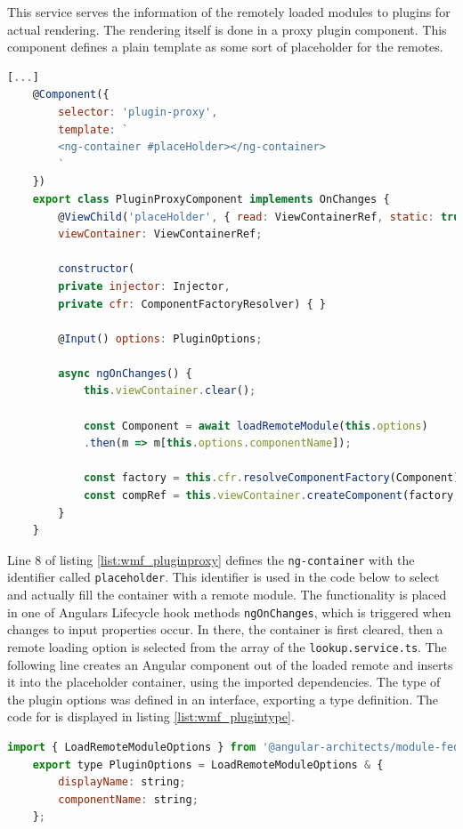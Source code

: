 This service serves the information of the remotely loaded modules to plugins for actual rendering. The rendering itself is done in a proxy plugin component. This component defines a plain template as some sort of placeholder for the remotes. \cite{wmf_angular_dynamicfederation}
\newpage
\begin{lstlisting}[language=JavaScript, caption=Content of \texttt{plugin-proxy.component.ts} for remote module loading in shell applications, label=list:wmf_pluginproxy,  xleftmargin=.01\textwidth, xrightmargin=.01\textwidth]
	[...]	
	@Component({
		selector: 'plugin-proxy',
		template: `
		<ng-container #placeHolder></ng-container>
		`
	})
	export class PluginProxyComponent implements OnChanges {
		@ViewChild('placeHolder', { read: ViewContainerRef, static: true })
		viewContainer: ViewContainerRef;
		
		constructor(
		private injector: Injector,
		private cfr: ComponentFactoryResolver) { }
		
		@Input() options: PluginOptions;
		
		async ngOnChanges() {
			this.viewContainer.clear();
			
			const Component = await loadRemoteModule(this.options)
			.then(m => m[this.options.componentName]);
			
			const factory = this.cfr.resolveComponentFactory(Component);
			const compRef = this.viewContainer.createComponent(factory, null, this.injector);		
		}
	}
\end{lstlisting}

Line 8 of listing \ref{list:wmf_pluginproxy} defines the \texttt{ng-container} with the identifier called \texttt{placeholder}. This identifier is used in the code below to select and actually fill the container with a remote module. The functionality is placed in one of Angulars Lifecycle hook methods \texttt{ngOnChanges}, which is triggered when changes to input properties occur.\cite{wmf_angular_lifecyclehooks} 
In there, the container is first cleared, then a remote loading option is selected from the array of the \texttt{lookup.service.ts}. The following line creates an Angular component out of the loaded remote and inserts it into the placeholder container, using the imported dependencies.
The type of the plugin options was defined in an interface, exporting a type definition. The code for is displayed in listing \ref{list:wmf_plugintype}.
\newpage
\begin{lstlisting}[language=JavaScript, caption=Content of \texttt{plugin.ts} for remote module loading in shell applications, label=list:wmf_plugintype,  xleftmargin=.01\textwidth, xrightmargin=.01\textwidth]
	import { LoadRemoteModuleOptions } from '@angular-architects/module-federation';
	export type PluginOptions = LoadRemoteModuleOptions & {
		displayName: string;
		componentName: string;
	};
\end{lstlisting}

